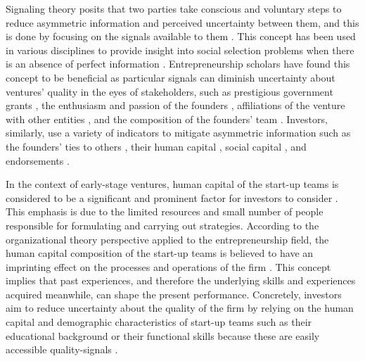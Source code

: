 \documentclass[12pt]{article}
\begin{document}
Signaling theory posits that two parties take conscious and voluntary steps to reduce asymmetric information and perceived uncertainty between them, and this is done by focusing on the signals available to them \citep{spence1974market}. This concept has been used in various disciplines to provide insight into social selection problems when there is an absence of perfect information \citep{connelly2011signaling, colombo2021use}. Entrepreneurship scholars have found this concept to be beneficial as particular signals can diminish uncertainty about ventures' quality in the eyes of stakeholders, such as prestigious government grants \citep{islam2018signaling}, the enthusiasm and passion of the founders \citep{chen2009entrepreneur}, affiliations of the venture with other entities \citep{plummer2016better}, and the composition of the founders' team \citep{ko2018signaling}. Investors, similarly, use a variety of indicators to mitigate asymmetric information such as the founders' ties to others \citep{shane2002network}, their human capital \citep{beckman2007early}, social capital \citep{shane2002organizational}, and endorsements \citep{courtney2017resolving, janney2006moderating, plummer2016better}.

In the context of early-stage ventures, human capital of the start-up teams is considered to be a significant and prominent factor for investors to consider \citep{beckman2007early, ko2018signaling, matusik2008values}. This emphasis is due to the limited resources and small number of people responsible for formulating and carrying out strategies. According to the organizational theory perspective applied to the entrepreneurship field, the human capital composition of the start-up teams is believed to have an imprinting effect on the processes and operations of the firm \citep{packalen2007complementing}. This concept implies that past experiences, and therefore the underlying skills and experiences acquired meanwhile, can shape the present performance. Concretely, investors aim to reduce uncertainty about the quality of the firm by relying on the human capital and demographic characteristics of start-up teams such as their educational background or their functional skills because these are easily accessible quality-signals \citep{colombo2005founders, beckman2007early, eddleston2016you, plummer2016better}.
\end{document}
